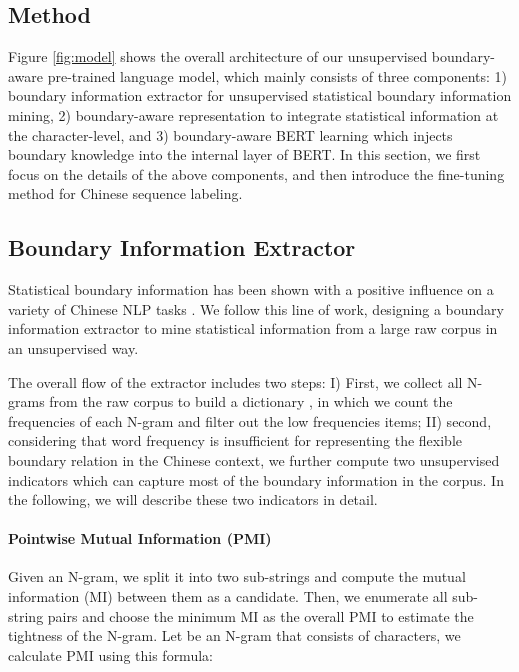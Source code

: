 \documentclass[11pt]{article}
\begin{document}
\begin{CJK}{UTF8}{gbsn}
\section{Method}
Figure \ref{fig:model} shows the overall architecture of our unsupervised boundary-aware pre-trained language model,
which mainly consists of three components:
1) boundary information extractor for unsupervised statistical boundary information mining,
2) boundary-aware representation to integrate statistical information at the character-level,
and 3) boundary-aware BERT learning which injects boundary knowledge into the internal layer of BERT.
In this section, we first focus on the details of the above components,
and then introduce the fine-tuning method for Chinese sequence labeling.

\subsection{Boundary Information Extractor}
\label{sec:unsper-bound-ext}
Statistical boundary information has been shown with a positive influence on a variety of Chinese NLP tasks \cite{Song12usinga, higashiyama-etal-2019-incorporating, ding-etal-2020-coupling, xiao-etal-2021-ernie}.
We follow this line of work, designing a boundary information extractor to mine statistical information from a large raw corpus in an unsupervised way.


The overall flow of the extractor includes two steps:
I) First, we collect all N-grams from the raw corpus to build a dictionary ,
in which we count the frequencies of each N-gram and filter out the low frequencies items; II) second, considering that word frequency is insufficient for representing the flexible boundary relation in the Chinese context,
we further compute two unsupervised indicators which can capture most of the boundary information in the corpus.
In the following, we will describe these two indicators in detail.








\paragraph{Pointwise Mutual Information (PMI)}
Given an N-gram, we split it into two sub-strings and compute the mutual information (MI) between them as a candidate.
Then, we enumerate all sub-string pairs and choose the minimum MI as the overall PMI to estimate the tightness of the N-gram.
Let  be an N-gram that consists of  characters, we calculate PMI using this formula:


\end{CJK}
\end{document}
